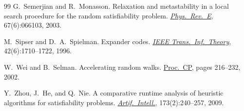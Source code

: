 \documentclass[11pt,a4paper]{article}
\theoremstyle{definition}
\theoremstyle{remark}
\begin{document}
\begin{thebibliography}{99}
G.~Semerjian and R.~Monasson.
\newblock Relaxation and metastability in a local search procedure for the random satisfiability problem.
\newblock \href{https://doi.org/10.1103/PhysRevE.67.066103}{\emph{Phys.\ Rev.\ E}}, 67(6):066103, 2003.

M.~Sipser and D.~A.~Spielman.
\newblock Expander codes.
\newblock \href{https://doi.org/10.1109/18.556667}{\emph{IEEE Trans.\ Inf.\ Theory}}, 42(6):1710--1722, 1996.

W.~Wei and B.~Selman.
\newblock Accelerating random walks.
\newblock \href{https://doi.org/10.1007/3-540-46135-3_15}{Proc.\ CP}, pages 216--232, 2002.

Y.~Zhou, J.~He, and Q.~Nie.
\newblock A comparative runtime analysis of heuristic algorithms for satisfiability problems.
\newblock \href{https://doi.org/10.1016/j.artint.2008.11.002}{\emph{Artif.\ Intell.}}, 173(2):240--257, 2009.

\end{thebibliography}
\end{document}
